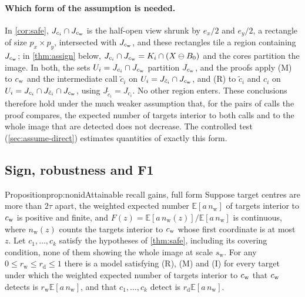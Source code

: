 \paragraph{Which form of the assumption is needed.} In \cref{cor:safe}, $J_{c_i} \cap J_{c_{\mathrm{w}}}$ is the half-open view shrunk by $e_x/2$ and $e_y/2$, a rectangle of size $p_x \times p_y$, intersected with $J_{c_{\mathrm{w}}}$, and these rectangles tile a region containing $J_{c_{\mathrm{w}}}$; in \cref{thm:assign} below, $J_{c_i} \cap J_{c_{\mathrm{w}}} = K_i \cap (X \ominus B_0)$ and the cores partition the image. In both, the sets $U_i = J_{c_i} \cap J_{c_{\mathrm{w}}}$ partition $J_{c_{\mathrm{w}}}$, and the proofs apply (M) to $c_{\mathrm{w}}$ and the intermediate call $\tilde c_i$ on $U_i = J_{\tilde c_i} \cap J_{c_{\mathrm{w}}}$, and (R) to $\tilde c_i$ and $c_i$ on $U_i = J_{c_i} \cap J_{\tilde c_i} \cap J_{c_{\mathrm{w}}}$, using $J_{\tilde c_i} = J_{c_i}$. No other region enters. These conclusions therefore hold under the much weaker assumption that, for the pairs of calls the proof compares, the expected number of targets interior to both calls and to the whole image that are detected does not decrease. The controlled test (\cref{sec:assume-direct}) estimates quantities of exactly this form.

\subsection{Sign, robustness and F1}
\label{sec:proofs-robust}

\begin{restate}{Proposition}{prop:nonid}{Attainable recall gains, full form}
Suppose target centres are more than $2\tau$ apart, the weighted expected number $\mathbb{E}[a\,n_{\mathrm{w}}]$ of targets interior to $c_{\mathrm{w}}$ is positive and finite, and $F(z) = \mathbb{E}[a\,n_{\mathrm{w}}(z)]/\mathbb{E}[a\,n_{\mathrm{w}}]$ is continuous, where $n_{\mathrm{w}}(z)$ counts the targets interior to $c_{\mathrm{w}}$ whose first coordinate is at most $z$. Let $c_1, \dots, c_k$ satisfy the hypotheses of \cref{thm:safe}, including its covering condition, none of them showing the whole image at scale $s_{\mathrm{w}}$. For any $0 \le r_{\mathrm{w}} \le r_{\mathrm{d}} \le 1$ there is a model satisfying (R), (M) and (I) for every target under which the weighted expected number of targets interior to $c_{\mathrm{w}}$ that $c_{\mathrm{w}}$ detects is $r_{\mathrm{w}}\mathbb{E}[a\,n_{\mathrm{w}}]$, and that $c_1, \dots, c_k$ detect is $r_{\mathrm{d}}\mathbb{E}[a\,n_{\mathrm{w}}]$.
\end{restate}

